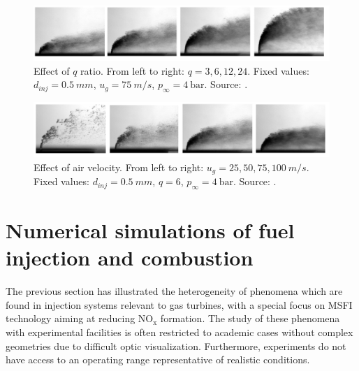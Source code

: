 \clearpage



\begin{figure}[h!]
	\centering
	\includegraphics[scale=0.45]{./part0_intro/parametric_JICF_q_ratio}
	\caption{Effect of $q$ ratio. From left to right: $q = 3, 6, 12, 24$. Fixed values: $d_{inj} = 0.5 ~mm$, $u_g = 75 ~m/s$, $p_\infty = 4 ~\mathrm{bar}$. Source: .}
	\label{fig:parametric_JICF_q_ratio}
\end{figure}

\begin{figure}[h!]
	\centering
	\includegraphics[scale=0.45]{./part0_intro/parametric_JICF_air_velocity}
	\caption{Effect of air velocity. From left to right: $u_g = 25, 50, 75, 100 ~m/s$. Fixed values: $d_{inj} = 0.5 ~mm$, $q = 6$, $p_\infty = 4 ~\mathrm{bar}$. Source: .}
	\label{fig:parametric_JICF_air_velocity}
\end{figure}


\section{Numerical simulations of fuel injection and combustion }

The previous section has illustrated the heterogeneity of phenomena which are found in injection systems relevant to gas turbines, with a special focus on MSFI technology aiming at reducing NO$_\mathrm{x}$ formation. The study of these phenomena with experimental facilities is often restricted to academic cases without complex geometries due to difficult optic visualization. Furthermore, experiments do not have access to an operating range representative of realistic conditions.

